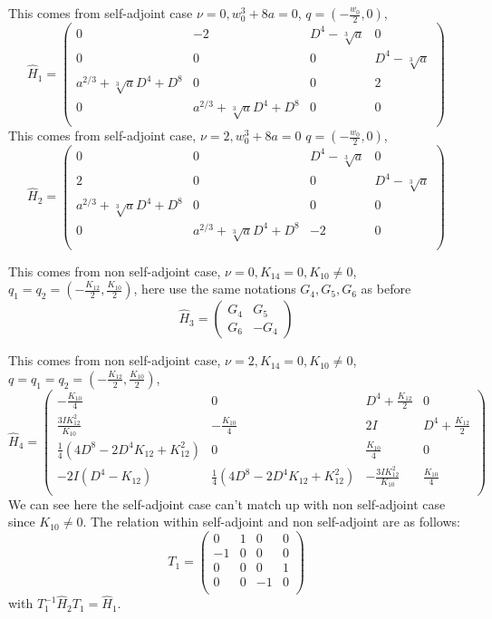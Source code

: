 \documentclass[11pt]{article}
\theoremstyle{definition}
\theoremstyle{plain}
\numberwithin{equation}{section}
\begin{document}
\begin{enumerate}
	This comes from self-adjoint case $\nu=0,w_0^3+8a=0$, $q=(-\frac{w_0}{2},0)$,
	$$
	\hat{H}_1=\left(
	\begin{array}{cccc}
		0 & -2 & D^4-\sqrt[3]{a} & 0 \\
		0 & 0 & 0 & D^4-\sqrt[3]{a} \\
		a^{2/3}+\sqrt[3]{a} D^4+D^8 & 0 & 0 & 2 \\
		0 & a^{2/3}+\sqrt[3]{a} D^4+D^8 & 0 & 0 \\
	\end{array}
	\right)
	$$
	This comes from self-adjoint case, $\nu=2,w_0^3+8a=0$ $q=(-\frac{w_0}{2},0)$,
	$$
	\hat{H}_2=\left(
	\begin{array}{cccc}
		0 & 0 & D^4-\sqrt[3]{a} & 0 \\
		2 & 0 & 0 & D^4-\sqrt[3]{a} \\
		a^{2/3}+\sqrt[3]{a} D^4+D^8 & 0 & 0 & 0 \\
		0 & a^{2/3}+\sqrt[3]{a} D^4+D^8 & -2 & 0 \\
	\end{array}
	\right)
	$$
	
	This comes from non self-adjoint case, $\nu=0,K_{14}=0,K_{10}\neq 0$, $q_1=q_2=(-\frac{K_{12}}{2},\frac{K_{10}}{2})$, here use the same notations $G_4,G_5,G_6$ as before
	$$\hat{H}_3=\begin{pmatrix}
		G_4	& G_5 \\
		G_6	& -G_4
	\end{pmatrix}$$
	
	This comes from non self-adjoint case, $\nu=2,K_{14}=0,K_{10}\neq 0$, $q=q_1=q_2=(-\frac{K_{12}}{2},\frac{K_{10}}{2})$,
	$$
	\hat{H}_4=\left(
	\begin{array}{cccc}
		-\frac{K_{10}}{4} & 0 & D^4+\frac{K_{12}}{2} & 0 \\
		\frac{3 I K_{12}^2}{K_{10}} & -\frac{K_{10}}{4} & 2 I & D^4+\frac{K_{12}}{2} \\
		\frac{1}{4} \left(4 D^8-2 D^4 K_{12}+K_{12}^2\right) & 0 & \frac{K_{10}}{4} & 0 \\
		-2 I \left(D^4-K_{12}\right) & \frac{1}{4} \left(4 D^8-2 D^4 K_{12}+K_{12}^2\right) & -\frac{3 I K_{12}^2}{K_{10}} & \frac{K_{10}}{4} \\
	\end{array}
	\right)
	$$
	We can see here the self-adjoint case can't match up with non self-adjoint case since $K_{10}\neq 0$. The relation within self-adjoint and non self-adjoint are as follows:
	$$
	T_1=\left(
	\begin{array}{cccc}
		0 & 1 & 0 & 0 \\
		-1 & 0 & 0 & 0 \\
		0 & 0 & 0 & 1 \\
		0 & 0 & -1 & 0 \\
	\end{array}
	\right)
	$$
	with $T_1^{-1}\hat{H}_2T_1=\hat{H}_1$.
	

\end{enumerate}
\end{document}
